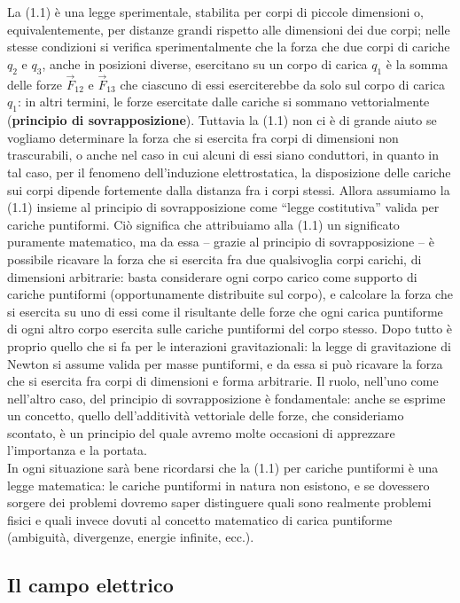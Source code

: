 La (1.1) è una legge sperimentale, stabilita per corpi di piccole dimensioni o, equivalentemente, per distanze grandi rispetto alle dimensioni dei due corpi; nelle stesse condizioni si verifica sperimentalmente che la forza che due corpi di cariche $q_2$ e $q_3$, anche in posizioni diverse, esercitano su un corpo di carica $q_1$ è la somma delle forze $\vec F_{12}$ e $\vec F_{13}$ che ciascuno di essi eserciterebbe da solo sul corpo di carica $q_1$: in altri termini, le forze esercitate dalle cariche si sommano vettorialmente (\textbf{principio di sovrapposizione}). Tuttavia la (1.1) non ci è di grande aiuto se vogliamo determinare la forza che si esercita fra corpi di dimensioni non trascurabili, o anche nel caso in cui alcuni di essi siano conduttori, in quanto in tal caso, per il fenomeno dell'induzione elettrostatica, la disposizione delle cariche sui corpi dipende fortemente dalla distanza fra i corpi stessi. Allora assumiamo la (1.1) insieme al principio di sovrapposizione
come ``legge costitutiva'' valida per cariche puntiformi. Ciò significa che attribuiamo alla (1.1) un significato puramente matematico, ma da essa -- grazie al principio di sovrapposizione -- è possibile ricavare la forza che si esercita fra due qualsivoglia corpi carichi, di dimensioni arbitrarie: basta considerare ogni corpo carico come supporto di cariche puntiformi (opportunamente distribuite sul corpo), e calcolare la forza che si esercita su uno di essi come il risultante delle forze che ogni carica puntiforme di ogni altro corpo esercita sulle cariche puntiformi del corpo stesso. Dopo tutto è proprio quello che si fa per le interazioni gravitazionali: la legge di gravitazione di Newton si assume valida per masse puntiformi, e da essa si può ricavare la forza che si esercita fra corpi di dimensioni e forma arbitrarie. Il ruolo, nell'uno come nell'altro caso, del principio di sovrapposizione è fondamentale: anche se esprime un concetto, quello dell'additività vettoriale delle forze, che consideriamo scontato, è un principio del quale avremo molte occasioni di apprezzare l'importanza e la portata.\\
In ogni situazione sarà bene ricordarsi che la (1.1) per cariche puntiformi è una legge matematica: le cariche puntiformi in natura non esistono, e se dovessero sorgere dei problemi dovremo saper distinguere quali sono realmente problemi fisici e quali invece dovuti al concetto matematico di carica puntiforme (ambiguità, divergenze, energie infinite, ecc.).

\subsection{Il campo elettrico}

